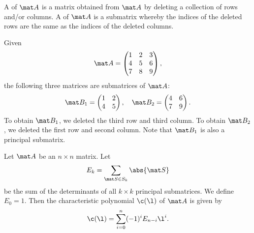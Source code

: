 \begin{definition}
    A  of $\mat A$ is a matrix obtained from $\mat A$ by deleting a collection of rows and/or columns. A  of $\mat A$ is a submatrix whereby the indices of the deleted rows are the same as the indices of the deleted columns. 
\end{definition}

\begin{example}
    Given \[\mat A = \begin{pmatrix}1 & 2 & 3 \\ 4 & 5 & 6 \\ 7 & 8 & 9\end{pmatrix},\] the following three matrices are submatrices of $\mat A$: \[\mat B_1 = \begin{pmatrix}1 & 2 \\ 4 & 5\end{pmatrix}, \quad \mat B_2 = \begin{pmatrix}4 & 6 \\ 7 & 9\end{pmatrix}.\] To obtain $\mat B_1$, we deleted the third row and third column. To obtain $\mat B_2$, we deleted the first row and second column. Note that $\mat B_1$ is also a principal submatrix.
\end{example}

\begin{proposition}
    Let $\mat A$ be an $n \times n$ matrix. Let \[E_k = \sum_{\mat S \in S_k} \abs{\mat S}\] be the sum of the determinants of all $k \times k$ principal submatrices. We define $E_0 = 1$. Then the characteristic polynomial $\c(\l)$ of $\mat A$ is given by \[\c(\l) = \sum_{i = 0}^n (-1)^i E_{n-i} \l^i.\]
\end{proposition}

